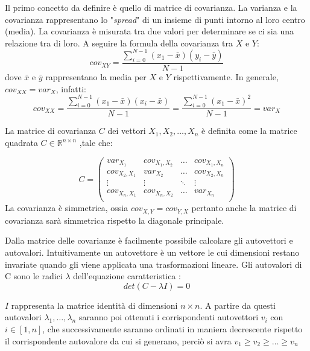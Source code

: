 Il primo concetto da definire è quello di matrice di covarianza. 
La varianza e la covarianza rappresentano lo "\textit{spread}" di un insieme di punti intorno al loro centro (media).
La covarianza è misurata tra due valori per determinare se ci sia una relazione tra di loro.
A seguire la formula della covarianza tra $X$ e $Y$:
\begin{equation*}
	cov_{XY} = \frac{\sum_{i=0}^{N-1} (x_1 - \bar{x})(y_i - \bar{y})}{N-1}
\end{equation*}
dove $\bar{x}$ e $\bar{y}$ rappresentano la media per $X$ e $Y$ rispettivamente. 
In generale, $cov_{XX} = var_X$, infatti:
\begin{equation*}
	cov_{XX} = \frac{\sum_{i=0}^{N-1}(x_1 - \bar{x})(x_i - \bar{x})}{N-1} = \frac{\sum_{i=0}^{N-1} (x_1 - \bar{x})^2}{N-1} = var_X
\end{equation*}

La matrice di covarianza $C$ dei vettori $X_1, X_2, \dots , X_n $ è definita come la matrice quadrata $C\in \mathbb{R}^{n \times n}$ ,tale che:

\begin{equation*}
	C= \begin{pmatrix}
		var_{X_1} & cov_{X_1,X_2} & \dots & cov_{X_1,X_n}\\ 
		cov_{X_2,X_1} & var_{X_2} & \dots & cov_{X_2,X_n}\\
		\vdots & \vdots & \ddots & \vdots \\
		cov_{X_n,X_1} &  cov_{X_n,X_2} & \dots & var_{X_n}\\
	\end{pmatrix}
\end{equation*}
\newline
La covarianza è simmetrica, ossia $cov_{X,Y} = cov_{Y,X}$ pertanto anche la matrice di covarianza sarà simmetrica rispetto la diagonale principale.

Dalla matrice delle covarianze è facilmente possibile calcolare gli autovettori e autovalori. Intuitivamente un autovettore è un vettore le cui dimensioni restano invariate quando gli viene applicata una trasformazioni lineare.
Gli autovalori di C sono le radici $\lambda$ dell'equazione caratteristica :
\begin{equation*}
	det(C - \lambda I) = 0
\end{equation*}

$I$ rappresenta la matrice identità di dimensioni $n \times n$.
A partire da questi autovalori $\lambda_1, \dots, \lambda_n$ saranno poi ottenuti i corrispondenti autovettori $v_i$ con $ i \in [1,n]$, che successivamente saranno ordinati in maniera decrescente rispetto il corrispondente autovalore da cui si generano, perciò si avra $ v_1  \geq v_2 \geq \dots \geq v_n$

